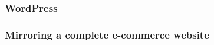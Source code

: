 










\subsubsection{WordPress}











\subsubsection{Mirroring a complete e-commerce website}





